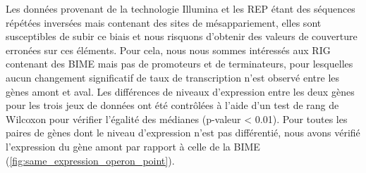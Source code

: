 \documentclass[12pt,a4paper]{report}
\begin{document}
\begin{onehalfspace}
Les données provenant de la technologie Illumina et les REP étant des séquences répétées inversées mais contenant des sites de mésappariement, elles sont susceptibles de subir ce biais et nous risquons d'obtenir des valeurs de couverture erronées sur ces éléments. Pour cela, nous nous sommes intéressés aux RIG contenant des BIME mais pas de promoteurs et de terminateurs, pour lesquelles aucun changement significatif de taux de transcription n'est observé entre les gènes amont et aval. Les  différences de niveaux d'expression entre les deux gènes pour les trois jeux de données ont été contrôlées à l'aide d'un test de rang de Wilcoxon pour vérifier l'égalité des médianes (p-valeur < 0.01). Pour toutes les paires de gènes dont le niveau d'expression n'est pas différentié, nous avons vérifié l'expression du gène amont par rapport à celle de la BIME (\autoref{fig:same_expression_operon_point}).

\begin{figure}
\end{figure}


\end{onehalfspace}
\end{document}
